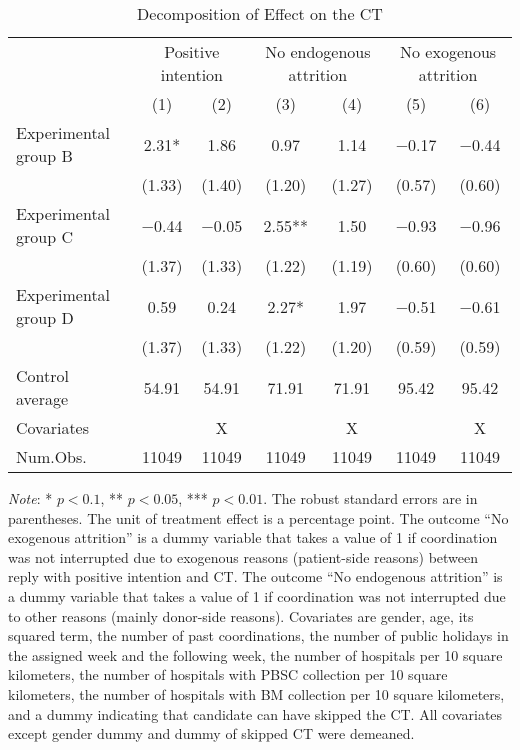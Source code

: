 \documentclass[12pt, a4paper]{article}
\begin{document}
\begin{table}[H]

\caption{\label{tab:lm-test-decompose}Decomposition of Effect on the CT}
\centering
\fontsize{8}{10}\selectfont
\begin{threeparttable}
\begin{tabular}[t]{>{\raggedright\arraybackslash}p{20em}cccccc}
\toprule
\multicolumn{1}{c}{ } & \multicolumn{2}{c}{Positive intention} & \multicolumn{2}{c}{No endogenous attrition} & \multicolumn{2}{c}{No exogenous attrition} \\
\cmidrule(l{3pt}r{3pt}){2-3} \cmidrule(l{3pt}r{3pt}){4-5} \cmidrule(l{3pt}r{3pt}){6-7}
  & (1) & (2) & (3) & (4) & (5) & (6)\\
\midrule
Experimental group B & \num{2.31}* & \num{1.86} & \num{0.97} & \num{1.14} & \num{-0.17} & \num{-0.44}\\
 & (\num{1.33}) & (\num{1.40}) & (\num{1.20}) & (\num{1.27}) & (\num{0.57}) & (\num{0.60})\\
Experimental group C & \num{-0.44} & \num{-0.05} & \num{2.55}** & \num{1.50} & \num{-0.93} & \num{-0.96}\\
 & (\num{1.37}) & (\num{1.33}) & (\num{1.22}) & (\num{1.19}) & (\num{0.60}) & (\num{0.60})\\
Experimental group D & \num{0.59} & \num{0.24} & \num{2.27}* & \num{1.97} & \num{-0.51} & \num{-0.61}\\
 & (\num{1.37}) & (\num{1.33}) & (\num{1.22}) & (\num{1.20}) & (\num{0.59}) & (\num{0.59})\\
\midrule
Control average & 54.91 & 54.91 & 71.91 & 71.91 & 95.42 & 95.42\\
Covariates &  & X &  & X &  & X\\
Num.Obs. & \num{11049} & \num{11049} & \num{11049} & \num{11049} & \num{11049} & \num{11049}\\
\bottomrule
\end{tabular}
\begin{tablenotes}
\item \emph{Note}: * $p < 0.1$, ** $p < 0.05$, *** $p < 0.01$. The robust standard errors are in parentheses. The unit of treatment effect is a percentage point. The outcome ``No exogenous attrition'' is a dummy variable that takes a value of 1 if coordination was not interrupted due to exogenous reasons (patient-side reasons) between reply with positive intention and CT. The outcome ``No endogenous attrition'' is a dummy variable that takes a value of 1 if coordination was not interrupted due to other reasons (mainly donor-side reasons). Covariates are gender, age, its squared term, the number of past coordinations, the number of public holidays in the assigned week and the following week, the number of hospitals per 10 square kilometers, the number of hospitals with PBSC collection per 10 square kilometers, the number of hospitals with BM collection per 10 square kilometers, and a dummy indicating that candidate can have skipped the CT. All covariates except gender dummy and dummy of skipped CT were demeaned.
\end{tablenotes}
\end{threeparttable}
\end{table}
\end{document}
